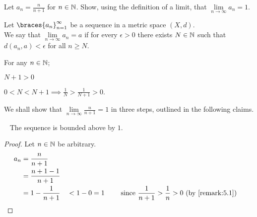 \begin{problem}
  Let $a_n = \frac{n}{n + 1}$ for $n \in \mathbb{N}$.
  Show, using the definition of a limit, that $\lim\limits_{n \to \infty}{a_n} = 1$.
\end{problem}
\begin{answer}
  \begin{definition}
    Let $\braces{a_n}_{n=1}^\infty$ be a sequence in a metric space $(X, d)$.\\
    We say that $\lim\limits_{n \to \infty} a_n = a$ if for every $\epsilon > 0$
    there exists $N \in \mathbb{N}$ such that $d(a_n, a) < \epsilon$ for all $n \geq N$.
  \end{definition}

  \begin{remark}
    For any $n \in \mathbb{N}$;
    \begin{enumarabic}
      \item $N + 1 > 0$
      \item $0 < N < N + 1 \implies \frac{1}{N} > \frac{1}{N + 1} > 0$.~\label{remark:5.1}
    \end{enumarabic}
  \end{remark}

  \step
  We shall show that $\lim\limits_{n \to \infty}{\frac{n}{n + 1}} = 1$
  in three steps, outlined in the following claims.

  \begin{claim}~\label{claim:5.1}
    The sequence is bounded above by $1$.

    \begin{proof}
      Let $n \in \mathbb{N}$ be arbitrary.
      \begin{alignat*}{3}
        a_n &= \frac{n}{n + 1} \\
            &= \frac{n + 1 - 1}{n + 1} \\
            &= 1 - \frac{1}{n + 1} &&< 1 - 0 = 1 \qquad \text{ since $\frac{1}{n+1} > \frac{1}{n} > 0$ (by~\ref{remark:5.1})}
      \end{alignat*}
    \end{proof}
  \end{claim}


\end{answer}
